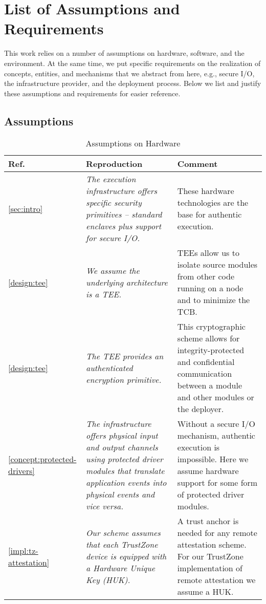 \section{List of Assumptions and Requirements}
\label{app:assumptions}

This work relies on a number of assumptions on hardware, software, and the
environment. At the same time, we put specific requirements on the realization
of concepts, entities, and mechanisms that we abstract from here, e.g., secure
I/O, the infrastructure provider, and the deployment process. Below we list and
justify these assumptions and requirements for easier reference.

\subsection{Assumptions}
\label{app:asm}

\setcounter{table}{0}
\renewcommand{\thetable}{\protect\NoHyper\ref{app:asm}.\arabic{table}\protect\endNoHyper}

\begin{longtable}{|p{}|p{}|p{}|}
\caption{Assumptions on Hardware}\\
\hline
Ref. & Reproduction & Comment \\
\hline
\hline

\ref{sec:intro} & 
\em The execution infrastructure offers specific security primitives -- standard enclaves plus support for secure I/O. &
These hardware technologies are the base for authentic execution. \\
\hline

\ref{design:tee} &
\em We assume the underlying architecture is a TEE. &
TEEs allow us to isolate source modules from other code running on a node and to minimize the TCB. \\
\hline

\ref{design:tee} &
\em The TEE provides an authenticated encryption primitive. &
This cryptographic scheme allows for integrity-protected and confidential communication between a module and other modules or the deployer. \\
\hline

\ref{concept:protected-drivers} &
\em The infrastructure offers physical input and output channels using protected driver modules that translate application events into physical events and vice versa. &
Without a secure I/O mechanism, authentic execution is impossible. Here we assume hardware support for some form of protected driver modules. \\
\hline

\ref{impl:tz-attestation} &
\em Our scheme assumes that each TrustZone device is equipped with a Hardware Unique Key (HUK). &
A trust anchor is needed for any remote attestation scheme. For our TrustZone implementation of remote attestation we assume a HUK.\\
\hline

\end{longtable}

